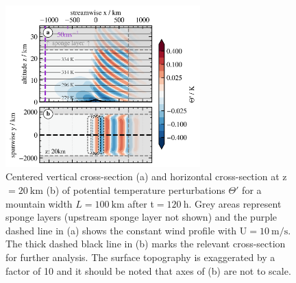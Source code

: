 \begin{figure}[t]
    \centering
    \includegraphics[width=0.67\textwidth]{figures_model/MWs-th-referenceSim.png}
    \caption{Centered vertical cross-section (a) and horizontal cross-section at z$=\SI{20}{\kilo\meter}$ (b) of potential temperature perturbations $\Theta'$ for a mountain width $L=\SI{100}{\kilo\meter}$ after t$=\SI{120}{\hour}$. Grey areas represent sponge layers (upstream sponge layer not shown) and the purple dashed line in (a) shows the constant wind profile with U$=\SI{10}{\meter\per\second}$. The thick dashed black line in (b) marks the relevant cross-section for further analysis. The surface topography is exaggerated by a factor of 10 and it should be noted that axes of (b) are not to scale.}
    \label{fig:MWs-reference}
\end{figure}

